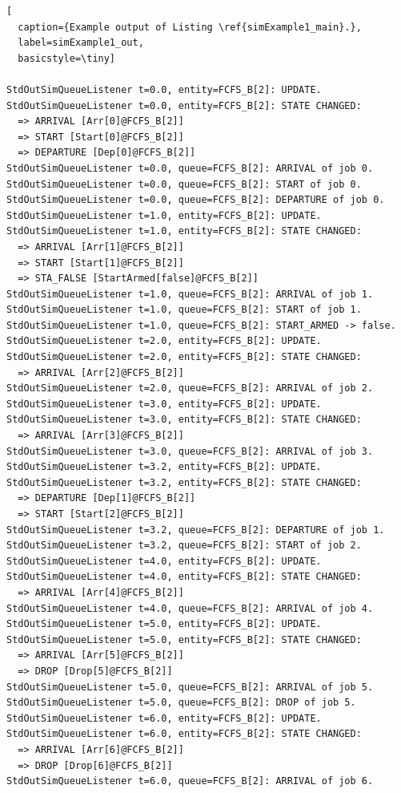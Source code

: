 \documentclass[12pt]{book}
\begin{document}
\begin{lstfloat}
\begin{lstlisting}[
  caption={Example output of Listing \ref{simExample1_main}.},
  label=simExample1_out,
  basicstyle=\tiny]

StdOutSimQueueListener t=0.0, entity=FCFS_B[2]: UPDATE.
StdOutSimQueueListener t=0.0, entity=FCFS_B[2]: STATE CHANGED:
  => ARRIVAL [Arr[0]@FCFS_B[2]]
  => START [Start[0]@FCFS_B[2]]
  => DEPARTURE [Dep[0]@FCFS_B[2]]
StdOutSimQueueListener t=0.0, queue=FCFS_B[2]: ARRIVAL of job 0.
StdOutSimQueueListener t=0.0, queue=FCFS_B[2]: START of job 0.
StdOutSimQueueListener t=0.0, queue=FCFS_B[2]: DEPARTURE of job 0.
StdOutSimQueueListener t=1.0, entity=FCFS_B[2]: UPDATE.
StdOutSimQueueListener t=1.0, entity=FCFS_B[2]: STATE CHANGED:
  => ARRIVAL [Arr[1]@FCFS_B[2]]
  => START [Start[1]@FCFS_B[2]]
  => STA_FALSE [StartArmed[false]@FCFS_B[2]]
StdOutSimQueueListener t=1.0, queue=FCFS_B[2]: ARRIVAL of job 1.
StdOutSimQueueListener t=1.0, queue=FCFS_B[2]: START of job 1.
StdOutSimQueueListener t=1.0, queue=FCFS_B[2]: START_ARMED -> false.
StdOutSimQueueListener t=2.0, entity=FCFS_B[2]: UPDATE.
StdOutSimQueueListener t=2.0, entity=FCFS_B[2]: STATE CHANGED:
  => ARRIVAL [Arr[2]@FCFS_B[2]]
StdOutSimQueueListener t=2.0, queue=FCFS_B[2]: ARRIVAL of job 2.
StdOutSimQueueListener t=3.0, entity=FCFS_B[2]: UPDATE.
StdOutSimQueueListener t=3.0, entity=FCFS_B[2]: STATE CHANGED:
  => ARRIVAL [Arr[3]@FCFS_B[2]]
StdOutSimQueueListener t=3.0, queue=FCFS_B[2]: ARRIVAL of job 3.
StdOutSimQueueListener t=3.2, entity=FCFS_B[2]: UPDATE.
StdOutSimQueueListener t=3.2, entity=FCFS_B[2]: STATE CHANGED:
  => DEPARTURE [Dep[1]@FCFS_B[2]]
  => START [Start[2]@FCFS_B[2]]
StdOutSimQueueListener t=3.2, queue=FCFS_B[2]: DEPARTURE of job 1.
StdOutSimQueueListener t=3.2, queue=FCFS_B[2]: START of job 2.
StdOutSimQueueListener t=4.0, entity=FCFS_B[2]: UPDATE.
StdOutSimQueueListener t=4.0, entity=FCFS_B[2]: STATE CHANGED:
  => ARRIVAL [Arr[4]@FCFS_B[2]]
StdOutSimQueueListener t=4.0, queue=FCFS_B[2]: ARRIVAL of job 4.
StdOutSimQueueListener t=5.0, entity=FCFS_B[2]: UPDATE.
StdOutSimQueueListener t=5.0, entity=FCFS_B[2]: STATE CHANGED:
  => ARRIVAL [Arr[5]@FCFS_B[2]]
  => DROP [Drop[5]@FCFS_B[2]]
StdOutSimQueueListener t=5.0, queue=FCFS_B[2]: ARRIVAL of job 5.
StdOutSimQueueListener t=5.0, queue=FCFS_B[2]: DROP of job 5.
StdOutSimQueueListener t=6.0, entity=FCFS_B[2]: UPDATE.
StdOutSimQueueListener t=6.0, entity=FCFS_B[2]: STATE CHANGED:
  => ARRIVAL [Arr[6]@FCFS_B[2]]
  => DROP [Drop[6]@FCFS_B[2]]
StdOutSimQueueListener t=6.0, queue=FCFS_B[2]: ARRIVAL of job 6.

\end{lstlisting}
\end{lstfloat}
\end{document}
